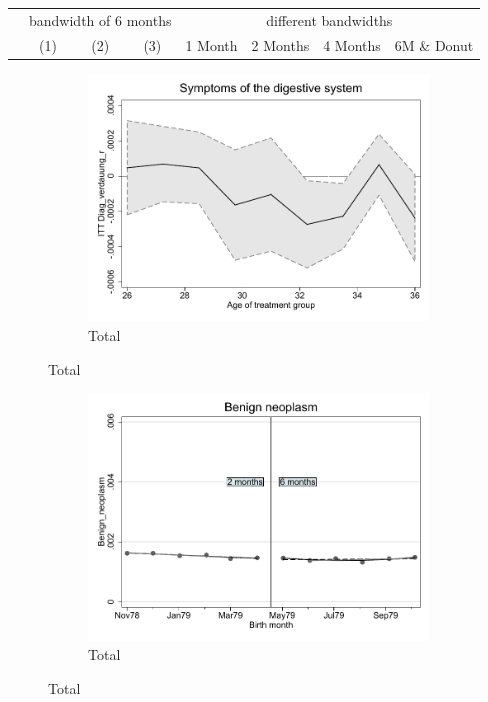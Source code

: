 \documentclass[a4paper ]{article}
\begin{document}
\begin{table}[h]\centering
\def\sym#1{\ifmmode^{#1}\else\(^{#1}\)\fi}
\begin{tabular}{l*{3}{c}|cccc}
\toprule
&\multicolumn{3}{c}{bandwidth of 6 months} & \multicolumn{4}{c}{different bandwidths} \\
 \cmidrule(lr{1em}){2-4} \cmidrule(lr{1em}){5-8}
 &\multicolumn{1}{c}{(1)}&\multicolumn{1}{c}{(2)}&\multicolumn{1}{c}{(3)}& 1 Month & 2 Months & 4 Months & 6M \& Donut \\
\midrule 

\bottomrule
\end{tabular}
\end{table}

\begin{figure}[h!]
	\centering
	\begin{subfigure}[t]{0.5\textwidth}
		\centering
		\includegraphics[width=0.99\textwidth]{R1_LC_Diag_verdauung_r}
		\caption{Total}		
	\end{subfigure}
\end{figure}
\newpage
\begin{figure}[h]
	\centering
	\begin{subfigure}[t]{0.5\textwidth}
		\centering
		\includegraphics[width=0.99\textwidth]{R1_RD_Benign_neoplasm_fits}
		\caption{Total}		
	\end{subfigure}
\end{figure}
\end{document}
